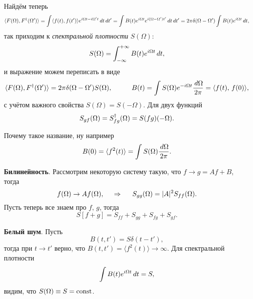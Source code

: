 Найдём теперь
\begin{equation*}
	\langle F(\Omega), F^{\dag} (\Omega')\rangle = \int \langle f(t), f(t')\rangle e^{i \Omega t - i \Omega' t} \, d t \, d t' = 
	\int B(t) e^{i \Omega t} e^{i (\Omega-\Omega')t'} \, d t \, d t' = 2 \pi \delta(\Omega-\Omega') \int B(t) e^{i \Omega t} \, d t,
\end{equation*}
так приходим к \textit{спектральной плотности} $S(\Omega)$:
\begin{equation*}
	S(\Omega) = \int_{-\infty}^{+\infty} B(t) e^{i \Omega t} \, d t,
\end{equation*}
и выражение можем переписать в виде
\begin{equation*}
	\langle F(\Omega), F\con (\Omega')\rangle  = 2 \pi \delta(\Omega-\Omega') S(\Omega),
	\hspace{10 mm} 
	B(t) = \int S(\Omega) e^{- i \Omega t} \frac{\d \Omega}{2\pi} = 
	\langle f(t),\, f(0)\rangle,
\end{equation*}
с учётом важного свойства $S(\Omega) = S(-\Omega)$. Для двух функций 
\begin{equation*}
	S_{gf} (\Omega) = S_{fg}^{\dag} (\Omega) = S(fg) (-\Omega).
\end{equation*}


Почему такое название, ну например
\begin{equation*}
	B(0) = \langle f^2(t)\rangle = \int S(\Omega) \frac{\, d \Omega}{2\pi}.   
\end{equation*}

\textbf{Билинейность}. Рассмотрим некоторую систему такую, что $f \to g=A f + B$, тогда
\begin{equation*}
	f(\Omega) \to A f(\Omega),
	\hspace{0.5cm} \Rightarrow \hspace{0.5cm}
	S_{gg} (\Omega) = |A|^2 S_{ff} (\Omega).
\end{equation*}
Пусть теперь все знаем про $f,\, g$,  тогда
\begin{equation*}
	S[f+g] = S_{ff} + S_{gg} + S_{fg} + S_{gf}.
\end{equation*}

\textbf{Белый шум}. Пусть
\begin{equation*}
	B(t, t') = S \delta(t-t'),
\end{equation*}
тогда при $t \to t'$ верно, что $B(t, t') = \langle f^2 (t)\rangle \to \infty$. Для спектральной плотности
\begin{equation*}
	\int B(t) e^{i \Omega t} \, d t = S, 
\end{equation*}
видим, что $S(\Omega) \equiv S = \textnormal{const}$. 


